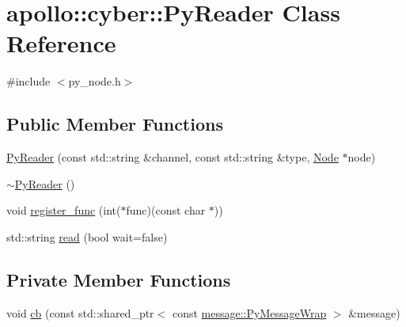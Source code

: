 \hypertarget{classapollo_1_1cyber_1_1PyReader}{\section{apollo\-:\-:cyber\-:\-:Py\-Reader Class Reference}
\label{classapollo_1_1cyber_1_1PyReader}
}


{\ttfamily \#include $<$py\-\_\-node.\-h$>$}

\subsection*{Public Member Functions}
\begin{DoxyCompactItemize}
\item 
\hyperlink{classapollo_1_1cyber_1_1PyReader_af5e97dfbc8da2df60b9c06bb4f0c7063}{Py\-Reader} (const std\-::string \&channel, const std\-::string \&type, \hyperlink{classapollo_1_1cyber_1_1Node}{Node} $\ast$node)
\item 
\hyperlink{classapollo_1_1cyber_1_1PyReader_a362405a62a638498f8eef80d8b257553}{$\sim$\-Py\-Reader} ()
\item 
void \hyperlink{classapollo_1_1cyber_1_1PyReader_a20dc2580266ac9c4004c507346956471}{register\-\_\-func} (int($\ast$func)(const char $\ast$))
\item 
std\-::string \hyperlink{classapollo_1_1cyber_1_1PyReader_a19b8a58d48a04ef2ec2a92901301815d}{read} (bool wait=false)
\end{DoxyCompactItemize}
\subsection*{Private Member Functions}
\begin{DoxyCompactItemize}
\item 
void \hyperlink{classapollo_1_1cyber_1_1PyReader_ac7f447071f9755e5e9e0d0cec4b5aa56}{cb} (const std\-::shared\-\_\-ptr$<$ const \hyperlink{classapollo_1_1cyber_1_1message_1_1PyMessageWrap}{message\-::\-Py\-Message\-Wrap} $>$ \&message)
\end{DoxyCompactItemize}
